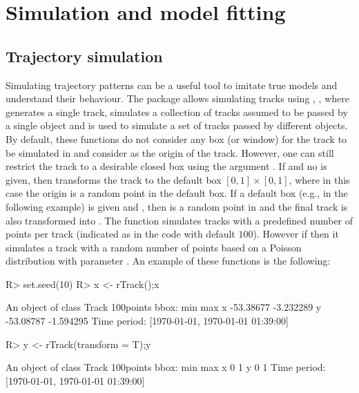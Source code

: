 \documentclass[article]{jss}
\begin{document}
\section{Simulation and model fitting}\label{simandfitt}
  \subsection{Trajectory simulation}
  Simulating trajectory patterns can be a useful tool to imitate true models and understand their behaviour. The package  allows simulating tracks using , ,  where  generates a single track,  simulates a collection of tracks assumed to be passed by a single object and  is used to simulate a set of tracks passed by different objects. By default, these functions do not consider any box (or window) for the track to be simulated in and consider  as the origin of the track. However, one can still restrict the track to a desirable closed box using the argument . If  and no  is given, then  transforms the track to the default box $[0,1]\times [0,1]$, where in this case the origin is a random point in the default box. If a default box  (e.g.,  in the following example) is given and , then  is a random point in  and the final track is also transformed into . The function  simulates tracks with a predefined number of points per track (indicated as  in the code with default $100$). However if  then it simulates a track with a random number of points based on a Poisson distribution with parameter . An example of these functions is the following:
\begin{Sinput}
R> set.seed(10)
R> x <- rTrack();x
\end{Sinput}
\begin{Soutput}
An object of class Track 
100points 
bbox: 
        min       max
x -53.38677 -3.232289
y -53.08787 -1.594295
Time period: [1970-01-01, 1970-01-01 01:39:00]
\end{Soutput}
\begin{Sinput}
R> y <- rTrack(transform = T);y
\end{Sinput}
\begin{Soutput}
An object of class Track 
100points 
bbox: 
  min max
x   0   1
y   0   1
Time period: [1970-01-01, 1970-01-01 01:39:00]
\end{Soutput}
\end{document}
